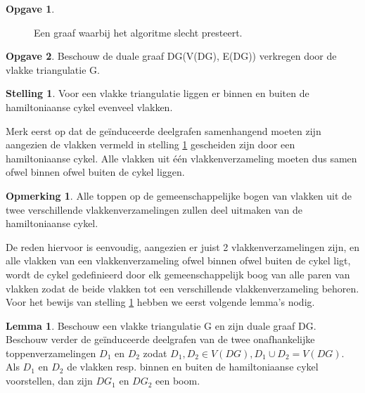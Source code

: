 \documentclass[11pt, a4paper, table]{article}
\theoremstyle{definition}
\newtheorem{opgave}{Opgave}
\theoremstyle{definition}
\theoremstyle{definition}
\newtheorem{opmerking}{Opmerking}
\newtheorem{stelling}{Stelling}
\newtheorem{lemma}{Lemma}
\begin{document}
\begin{opgave}
\begin{figure}[H]
		\caption{Een graaf waarbij het algoritme slecht presteert.}
		\label{fig:worstcase}
	\end{figure}
\end{opgave}
\begin{opgave}
	Beschouw de duale graaf DG(V(DG), E(DG)) verkregen door de vlakke triangulatie G. 
	\begin{stelling}
		\label{stelling1}
		Voor een vlakke triangulatie liggen er binnen en buiten de hamiltoniaanse cykel evenveel vlakken. 
	\end{stelling}
	Merk eerst op dat de ge\"{i}nduceerde deelgrafen samenhangend moeten zijn aangezien de vlakken vermeld in stelling \ref{stelling1} gescheiden zijn door een hamiltoniaanse cykel. Alle vlakken uit \'{e}\'{e}n vlakkenverzameling moeten dus samen ofwel binnen ofwel buiten de cykel liggen. 
	\begin{opmerking}
		\label{opmerking1}
		Alle toppen op de gemeenschappelijke bogen van vlakken uit de twee verschillende vlakkenverzamelingen zullen deel uitmaken van de hamiltoniaanse cykel. 
	\end{opmerking}
	De reden hiervoor is eenvoudig, aangezien er juist 2 vlakkenverzamelingen zijn, en alle vlakken van een vlakkenverzameling ofwel binnen ofwel buiten de cykel ligt, wordt de cykel gedefinieerd door elk gemeenschappelijk boog van alle paren van vlakken zodat de beide vlakken tot een verschillende vlakkenverzameling behoren. Voor het bewijs van stelling \ref{stelling1} hebben we eerst volgende lemma's nodig. 

	\begin{lemma}	
		\label{lemma1}
		Beschouw een vlakke	triangulatie G en zijn duale graaf DG. 
		Beschouw verder de ge\"{i}nduceerde deelgrafen van de twee onafhankelijke toppenverzamelingen $D_1$ en $D_2$ zodat $D_1, D_2 \in V(DG) , D_1 \cup D_2 = V(DG)$.  Als $D_1$ en $D_2$ de vlakken resp. binnen en buiten de hamiltoniaanse cykel voorstellen, dan zijn $DG_1$ en $DG_2$ een boom.   
		
	\end{lemma}
	

\end{opgave}
\end{document}
